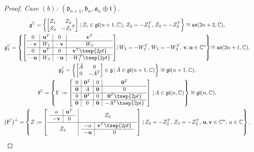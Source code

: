 \documentclass[pdftex]{sigma}
\numberwithin{equation}{section}
\begin{document}
\begin{proof}
\emph{Case $(b)$: $(\mathfrak{d}_{n+1},\mathfrak{b}_n,\mathfrak{a}_n\oplus \mathfrak{t})$.}%
\begin{gather*}
 \mathfrak{g}^\mathbb{C}=\left\{ \left[ \begin{matrix} Z_{1}&Z_{2}\\ Z_{3}&-{Z_{1}}^{T}\end{matrix} \right] \,|\, Z_i\in \mathfrak{gl}(n+1,\mathbb{C}),\, Z_2=-Z_2^T,\, Z_3=-Z_3^T \right\} \cong \mathfrak{so}(2n+2,\mathbb{C}) ,\\
 \mathfrak{g}_1^\mathbb{C}=\left\{ \left[
\begin {array}{c|c|c|c}
0&\mathbf{u}^T&0&\mathbf{v}^T\\ \hline
-\mathbf{v}&W_{1}&-\mathbf{v}&W_{2}\\ \hline
0&\mathbf{u}^T&0&\mathbf{v}^T\tsep{2pt}\\ \hline
-\mathbf{u}&W_{3}&-\mathbf{u}&-W_{1}^{T}\tsep{2pt}
\end {array} \right] \!|\, W_2=-W^T_2,\, W_3=-W_3^T,\, \mathbf{v},\mathbf{u} \in \mathbb{C}^n\! \right\}\! \cong \mathfrak{so}(2n+1,\mathbb{C}),\\
\mathfrak{g}_2^\mathbb{C}=\left\{ \left[ \begin{matrix} \tilde{A}&0\\ 0&-\tilde{A}^{T}
\end{matrix} \right] \in \mathfrak{g} \,|\, \tilde{A}\in \mathfrak{gl}(n+1,\mathbb{C}) \right\} \cong \mathfrak{gl}(n+1,\mathbb{C}),\\
\mathfrak{k}^\mathbb{C}=\left\{ Y:=\left[
\begin {array}{c|c|c|c}
0&\mathbf{0}^T&0&\mathbf{0}^T \\ \hline
\mathbf{0}&A&\mathbf{0}&0 \\ \hline
0&\mathbf{0}^T&0&\mathbf{0}^T \tsep{2pt}\\ \hline
\mathbf{0}&0&\mathbf{0}&-{A}^{T}\tsep{2pt}
\end {array} \right] \,|\, A \in \mathfrak{gl}(n,\mathbb{C}) \right\}\cong \mathfrak{gl}(n,\mathbb{C}),\\
\big(\mathfrak{k}^\mathbb{C}\big)^\perp=\left\{Z:=\left[ \begin {array}{c|c}
\begin {array}{c|c} a&\mathbf{u}^T \\ \hline -\mathbf{v}& 0 \end {array} & Z_2 \\ \hline
Z_3 & \begin {array}{c|c} -a& \mathbf{v}^T\tsep{2pt} \\ \hline-\mathbf{u}&0 \end {array}
\end {array} \right] \,|\, Z_2=-Z_2^T,\, Z_3=-Z_3^T,\, \mathbf{u},\mathbf{v}\in \mathbb{C}^n,\, a\in \mathbb{C} \right\}.
\end{gather*}


\end{proof}
\end{document}
